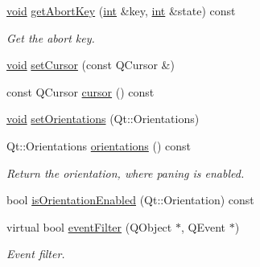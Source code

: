 \begin{DoxyCompactItemize}
\item 
\hyperlink{group___u_a_v_objects_plugin_ga444cf2ff3f0ecbe028adce838d373f5c}{void} \hyperlink{class_qwt_panner_ac91ce9e6162515c710875e639f242119}{get\-Abort\-Key} (\hyperlink{ioapi_8h_a787fa3cf048117ba7123753c1e74fcd6}{int} \&key, \hyperlink{ioapi_8h_a787fa3cf048117ba7123753c1e74fcd6}{int} \&state) const 
\begin{DoxyCompactList}\small\item\em Get the abort key. \end{DoxyCompactList}\item 
\hyperlink{group___u_a_v_objects_plugin_ga444cf2ff3f0ecbe028adce838d373f5c}{void} \hyperlink{class_qwt_panner_ac8b0625fe155fff0132df85727f54a3e}{set\-Cursor} (const Q\-Cursor \&)
\item 
const Q\-Cursor \hyperlink{class_qwt_panner_a05a9ded33442da7f18c30bd06d45b55b}{cursor} () const 
\item 
\hyperlink{group___u_a_v_objects_plugin_ga444cf2ff3f0ecbe028adce838d373f5c}{void} \hyperlink{class_qwt_panner_aaa71a8b6f7f46ae8f5a8084094d7bd9a}{set\-Orientations} (Qt\-::\-Orientations)
\item 
Qt\-::\-Orientations \hyperlink{class_qwt_panner_a4e7a195ed909f18d33a05b1b7c1f0930}{orientations} () const 
\begin{DoxyCompactList}\small\item\em Return the orientation, where paning is enabled. \end{DoxyCompactList}\item 
bool \hyperlink{class_qwt_panner_ac1117576e69a4f32d24ef5ec81da7bbd}{is\-Orientation\-Enabled} (Qt\-::\-Orientation) const 
\item 
virtual bool \hyperlink{class_qwt_panner_a06b8eea86d4dcbe361c4af41a263f2cb}{event\-Filter} (Q\-Object $\ast$, Q\-Event $\ast$)
\begin{DoxyCompactList}\small\item\em Event filter. \end{DoxyCompactList}\end{DoxyCompactItemize}
